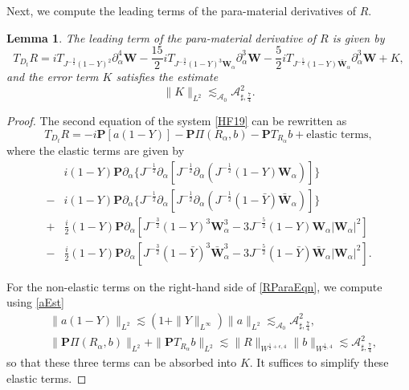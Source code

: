 \documentclass[10pt]{amsart}
\newtheorem{lemma}[theorem]{Lemma}
\theoremstyle{remark}
\theoremstyle{definition}
\numberwithin{equation}{section}
\newcommand{\p}{\partial}
\newcommand{\al}{\alpha}
\newcommand{\f}{\frac}
\newcommand{\bw}{\mathbf{W}}
\newcommand{\nP}{{\mathbf P}}
\newcommand{\CalAZ}{{\mathcal{A}_0}}
\newcommand{\ASSharp}{{\mathcal{A}_{\sharp,\frac{7}{4}}^2}}
\begin{document}
Next, we compute the leading terms of the para-material derivatives of $R$.
\begin{lemma}
The leading term of the para-material derivative of $R$ is given by
\begin{equation}
T_{D_t}R =  iT_{J^{-\frac{3}{2}}(1-Y)^2}\p^4_\alpha\bw -\frac{15}{2}iT_{J^{-\f32}(1-Y)^3 \bw_\al} \p_\al^3 \bw - \f52iT_{J^{-\f52}(1-Y)\bar{\bw}_\al}\p_\al^3 \bw  +K, \label{RParaMat}
\end{equation}
and the error term $K$ satisfies the estimate
\begin{equation*}
 \| K\|_{L^2} \lesssim_{\CalAZ} \ASSharp.
\end{equation*}
\end{lemma}

\begin{proof}
The second equation of the system \eqref{HF19} can be rewritten as
\begin{equation} \label{RParaEqn}
T_{D_t}R = -i\nP[a(1-Y)] - \nP\Pi(R_\alpha, b) - \nP T_{R_\alpha}b + \text{elastic terms},  
\end{equation}
where the elastic terms are given by 
\begin{align*}
    &i(1-Y)\nP\p_\al\{J^{-\f12}\p_\al[J^{-\f12}\p_\al(J^{-\f12}(1-Y)\bw_\alpha)] \} \\
    -& i(1-Y)\nP\p_\al\{J^{-\f12}\p_\al[J^{-\f12}\p_\al(J^{-\f12}(1-\bar{Y})\bar{\bw}_\alpha)] \} \\
    +&\frac{i}{2}(1-Y)\nP\p_\al[J^{-\f32}(1-Y)^3 \bw_\alpha^3 -3J^{-\f52}(1-Y)\bw_\alpha |\bw_\al|^2]\\
    -&\frac{i}{2}(1-Y)\nP\p_\al[J^{-\f32}(1-\bar{Y})^3 \bar{\bw}_\alpha^3 -3J^{-\f52}(1-\bar{Y})\bar{\bw}_\alpha |\bw_\al|^2].
\end{align*}

For the non-elastic terms on the right-hand side of \eqref{RParaEqn}, we compute using \eqref{aEst}
\begin{align*}
 &\|a(1-Y) \|_{L^2} \lesssim (1+ \|Y\|_{L^\infty})\|a\|_{L^2} \lesssim_\CalAZ \ASSharp, \\
 &\|\nP\Pi(R_\alpha, b)\|_{L^2} + \|\nP T_{R_\alpha}b \|_{L^2} \lesssim \|R\|_{W^{\frac{1}{2}+\epsilon,4}} \|b\|_{W^{\f12,4}} \lesssim \ASSharp,
\end{align*}
so that these three terms can be absorbed into $K$.
It suffices to simplify these elastic terms.


\end{proof}
\end{document}
